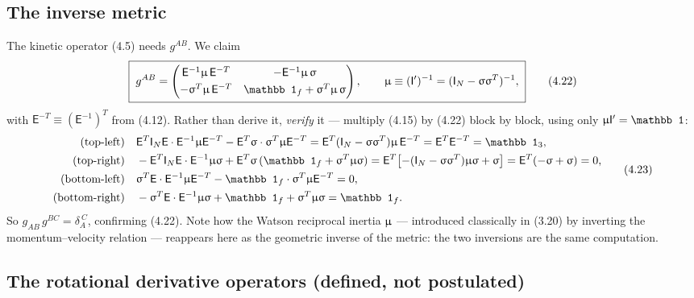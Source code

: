 \subsection{The inverse metric}

The kinetic operator (4.5) needs $g^{AB}$. We claim
\begin{equation}
\boxed{\;
g^{AB}=
\begin{pmatrix}
\mathsf E^{-1}\Mmu\,\mathsf E^{-T} & -\mathsf E^{-1}\Mmu\,\Msig\\[3pt]
-\Msig^{T}\Mmu\,\mathsf E^{-T} & \mathbb 1_f+\Msig^{T}\Mmu\,\Msig
\end{pmatrix},
\qquad \Mmu\equiv(\mathsf I')^{-1}=(\mathsf I_N-\Msig\Msig^{T})^{-1},\;}\tag{4.22}
\end{equation}
with $\mathsf E^{-T}\equiv(\mathsf E^{-1})^{T}$ from (4.12). Rather than derive it, \emph{verify} it --- multiply (4.15) by (4.22) block by block, using only $\Mmu\mathsf I'=\mathbb 1$:
\begin{equation}
\begin{aligned}
\text{(top-left)}\quad &\mathsf E^{T}\mathsf I_N\mathsf E\cdot\mathsf E^{-1}\Mmu\mathsf E^{-T}-\mathsf E^{T}\Msig\cdot\Msig^{T}\Mmu\mathsf E^{-T}
=\mathsf E^{T}(\mathsf I_N-\Msig\Msig^{T})\Mmu\,\mathsf E^{-T}=\mathsf E^{T}\mathsf E^{-T}=\mathbb 1_3,\\
\text{(top-right)}\quad &-\mathsf E^{T}\mathsf I_N\mathsf E\cdot\mathsf E^{-1}\Mmu\Msig+\mathsf E^{T}\Msig\,(\mathbb 1_f+\Msig^{T}\Mmu\Msig)
=\mathsf E^{T}\bigl[-(\mathsf I_N-\Msig\Msig^{T})\Mmu\Msig+\Msig\bigr]=\mathsf E^{T}(-\Msig+\Msig)=0,\\
\text{(bottom-left)}\quad &\Msig^{T}\mathsf E\cdot\mathsf E^{-1}\Mmu\mathsf E^{-T}-\mathbb 1_f\cdot\Msig^{T}\Mmu\mathsf E^{-T}=0,\\
\text{(bottom-right)}\quad &-\Msig^{T}\mathsf E\cdot\mathsf E^{-1}\Mmu\Msig+\mathbb 1_f+\Msig^{T}\Mmu\Msig=\mathbb 1_f .
\end{aligned}\tag{4.23}
\end{equation}
So $g_{AB}\,g^{BC}=\delta_A^{\ C}$, confirming (4.22). Note how the Watson reciprocal inertia $\upmu$ --- introduced classically in (3.20) by inverting the momentum--velocity relation --- reappears here as the geometric inverse of the metric: the two inversions are the same computation.

\subsection{The rotational derivative operators (defined, not postulated)}


